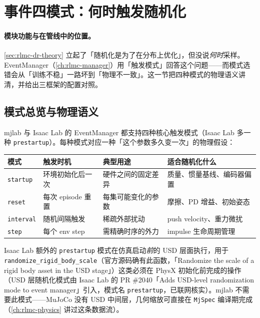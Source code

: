 \section{事件四模式：何时触发随机化}
\label{sec:rlmc-dr-mode}

\paragraph{模块功能与在管线中的位置。}\cref{sec:rlmc-dr-theory} 立起了「随机化是为了在分布上优化」，但没说\emph{何时}采样。EventManager（\cref{ch:rlmc-manager}）用「触发模式」回答这个问题——而模式选错会从「训练不稳」一路坏到「物理不一致」。这一节把四种模式的物理语义讲清，并给出三框架的配置对照。

\subsection{模式总览与物理语义}
\label{sec:rlmc-dr-mode-overview}

mjlab 与 Isaac Lab 的 EventManager 都支持四种核心触发模式（Isaac Lab 多一种 \verb|prestartup|）。每种模式对应一种「这个参数多久变一次」的物理假设：

\begin{center}
\small
\begin{tabular}{@{}llp{3.6cm}p{3.6cm}@{}}
\toprule
模式 & 触发时机 & 典型用途 & 适合随机化什么 \\
\midrule
\verb|startup| & 环境初始化后一次 & 硬件之间的固定差异 & 质量、惯量基线、编码器偏置 \\
\verb|reset| & 每次 episode 重置 & 每集可能变化的参数 & 摩擦、PD 增益、初始姿态 \\
\verb|interval| & 随机间隔触发 & 稀疏外部扰动 & push velocity、重力微扰 \\
\verb|step| & 每个 env step & 需精确时序的外力 & impulse 生命周期管理 \\
\bottomrule
\end{tabular}
\end{center}

Isaac Lab 额外的 \verb|prestartup| 模式在仿真启动\emph{前}的 USD 层面执行，用于 \verb|randomize_rigid_body_scale|（官方源码确有此函数，「Randomize the scale of a rigid body asset in the USD stage」）这类必须在 PhysX 初始化前完成的操作（USD 层随机化模式由 Isaac Lab 的 PR \#2040「Adds USD-level randomization mode to event manager」引入，模式名 \texttt{prestartup}，已联网核实）。mjlab 不需要此模式——MuJoCo 没有 USD 中间层，几何缩放可直接在 \verb|MjSpec| 编译期完成（\cref{ch:rlmc-physics} 讲过这条数据流）。

